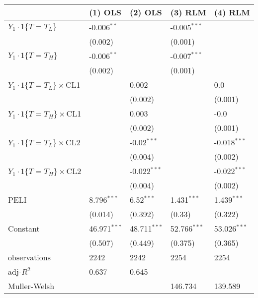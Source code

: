 \begin{tabular}{lllll}
\hline
 & (1) OLS & (2) OLS & (3) RLM & (4) RLM \\
\hline
$Y_1\cdot1\{T=T_L\}$ & -0.006$^{**}$ &  & -0.005$^{***}$ &  \\
 & (0.002) &  & (0.001) &  \\
$Y_1\cdot1\{T=T_H\}$ & -0.006$^{**}$ &  & -0.007$^{***}$ &  \\
 & (0.002) &  & (0.001) &  \\
$Y_1\cdot1\{T=T_L\}\times$CL1 &  & 0.002 &  & 0.0 \\
 &  & (0.002) &  & (0.001) \\
$Y_1\cdot1\{T=T_H\}\times$CL1 &  & 0.003 &  & -0.0 \\
 &  & (0.002) &  & (0.001) \\
$Y_1\cdot1\{T=T_L\}\times$CL2 &  & -0.02$^{***}$ &  & -0.018$^{***}$ \\
 &  & (0.004) &  & (0.002) \\
$Y_1\cdot1\{T=T_H\}\times$CL2 &  & -0.022$^{***}$ &  & -0.022$^{***}$ \\
 &  & (0.004) &  & (0.002) \\
PELI & 8.796$^{***}$ & 6.52$^{***}$ & 1.431$^{***}$ & 1.439$^{***}$ \\
 & (0.014) & (0.392) & (0.33) & (0.322) \\
Constant & 46.971$^{***}$ & 48.711$^{***}$ & 52.766$^{***}$ & 53.026$^{***}$ \\
 & (0.507) & (0.449) & (0.375) & (0.365) \\\hline

observations & 2242 & 2242 & 2254 & 2254 \\
adj-$R^2$ & 0.637 & 0.645 &  &  \\
Muller-Welsh &  &  & 146.734 & 139.589 \\
\hline
\end{tabular}
